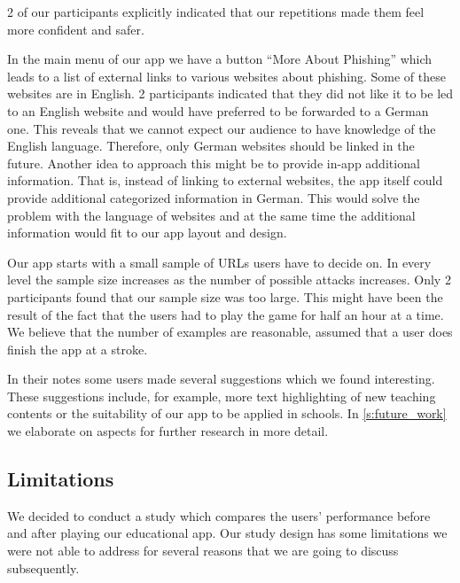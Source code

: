 \begin{description}[leftmargin=0cm]
2 of our participants explicitly indicated that our repetitions made them feel more confident and safer.
	\item[External Links:]
In the main menu of our app we have a button ``More About Phishing'' which leads to a list of external links to various websites about phishing.
Some of these websites are in English.
2 participants indicated that they did not like it to be led to an English website and would have preferred to be forwarded to a German one.
This reveals that we cannot expect our audience to have knowledge of the English language.
Therefore, only German websites should be linked in the future.
Another idea to approach this might be to provide in-app additional information.
That is, instead of linking to external websites, the app itself could provide additional categorized information in German.
This would solve the problem with the language of websites and at the same time the additional information would fit to our app layout and design.
	\item[Amount of Examples:] Our app starts with a small sample of URLs users have to decide on.
In every level the sample size increases as the number of possible attacks increases.
Only 2 participants found that our sample size was too large.
This might have been the result of the fact that the users had to play the game for half an hour at a time.
We believe that the number of examples are reasonable, assumed that a user does finish the app at a stroke.
	\item[Further Suggestions:] In their notes some users made several suggestions which we found interesting.
These suggestions include, for example, more text highlighting of new teaching contents or the suitability of our app to be applied in schools.
In \autoref{s:future_work} we elaborate on aspects for further research in more detail.
\end{description}

\subsection{Limitations}
We decided to conduct a study which compares the users' performance before and after playing our educational app.
Our study design has some limitations we were not able to address for several reasons that we are going to discuss subsequently.

